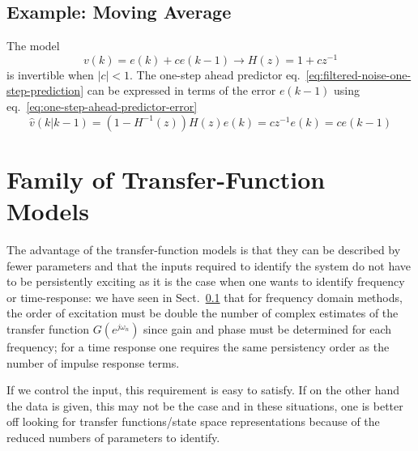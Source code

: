 \subsection{Example: Moving Average}

The model
\begin{equation*}
  v(k) = e(k) + ce(k-1) \rightarrow H(z) = 1+cz^{-1}
\end{equation*}
is invertible when $|c|<1$. The one-step ahead predictor eq.~\eqref{eq:filtered-noise-one-step-prediction} can be expressed in terms of the error $e(k-1)$ using eq.~\eqref{eq:one-step-ahead-predictor-error}
\begin{equation*}
  \hat{v}(k|k-1) = \left(1-H^{-1}(z)\right)H(z)e(k) = cz^{-1}e(k) =  ce(k-1)
\end{equation*}

\section{Family of Transfer-Function Models}
\label{sec:family-tf-models}

The advantage of the transfer-function models is that they can be described by fewer parameters and that the inputs required to identify the system do not have to be persistently exciting as it is the case when one wants to identify frequency or time-response: we have seen in Sect.~\ref{} that for frequency domain methods, the order of excitation must be double the number of complex estimates of the transfer function $G(e^{j\omega_n})$ since gain and phase must be determined for each frequency; for a time response one requires the same persistency order as the number of impulse response terms.

If we control the input, this requirement is easy to satisfy. If on the other hand the data is given, this may not be the case and in these situations, one is better off looking for transfer functions/state space representations because of the reduced numbers of parameters to identify.

